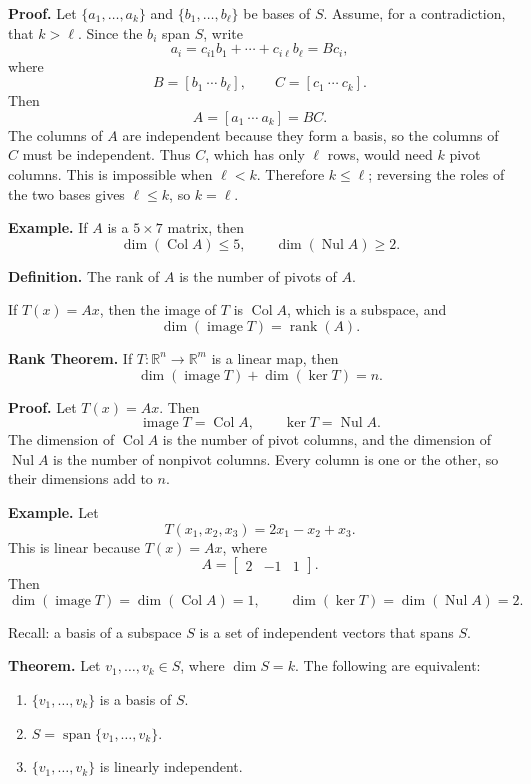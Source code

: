 \documentclass{article}
\begin{document}
\textbf{Proof.} Let $\{a_1,\ldots,a_k\}$ and $\{b_1,\ldots,b_\ell\}$ be bases of $S$. Assume, for a contradiction, that $k>\ell$. Since the $b_i$ span $S$, write
\[
a_i=c_{i1}b_1+\cdots+c_{i\ell}b_\ell=Bc_i,
\]
where
\[
B=[b_1\ \cdots\ b_\ell],
\qquad
C=[c_1\ \cdots\ c_k].
\]
Then
\[
A=[a_1\ \cdots\ a_k]=BC.
\]
The columns of $A$ are independent because they form a basis, so the columns of $C$ must be independent. Thus $C$, which has only $\ell$ rows, would need $k$ pivot columns. This is impossible when $\ell<k$. Therefore $k\leq\ell$; reversing the roles of the two bases gives $\ell\leq k$, so $k=\ell$.

\bigskip

\textbf{Example.} If $A$ is a $5\times 7$ matrix, then
\[
\dim(\operatorname{Col} A)\leq 5,
\qquad
\dim(\operatorname{Nul} A)\geq 2.
\]

\medskip

\textbf{Definition.} The rank of $A$ is the number of pivots of $A$.

\medskip

If $T(x)=Ax$, then the image of $T$ is $\operatorname{Col} A$, which is a subspace, and
\[
\dim(\operatorname{image} T)=\operatorname{rank}(A).
\]

\newpage

\textbf{Rank Theorem.} If $T:\mathbb{R}^n\to\mathbb{R}^m$ is a linear map, then
\[
\dim(\operatorname{image} T)+\dim(\ker T)=n.
\]

\textbf{Proof.} Let $T(x)=Ax$. Then
\[
\operatorname{image} T=\operatorname{Col} A,
\qquad
\ker T=\operatorname{Nul} A.
\]
The dimension of $\operatorname{Col} A$ is the number of pivot columns, and the dimension of $\operatorname{Nul} A$ is the number of nonpivot columns. Every column is one or the other, so their dimensions add to $n$.

\medskip

\textbf{Example.} Let
\[
T(x_1,x_2,x_3)=2x_1-x_2+x_3.
\]
This is linear because $T(x)=Ax$, where
\[
A=\begin{bmatrix}2&-1&1\end{bmatrix}.
\]
Then
\[
\dim(\operatorname{image} T)=\dim(\operatorname{Col} A)=1,
\qquad
\dim(\ker T)=\dim(\operatorname{Nul} A)=2.
\]

\bigskip

Recall: a basis of a subspace $S$ is a set of independent vectors that spans $S$.

\medskip

\textbf{Theorem.} Let $v_1,\ldots,v_k\in S$, where $\dim S=k$. The following are equivalent:
\begin{enumerate}
\item $\{v_1,\ldots,v_k\}$ is a basis of $S$.
\item $S=\operatorname{span}\{v_1,\ldots,v_k\}$.
\item $\{v_1,\ldots,v_k\}$ is linearly independent.
\end{enumerate}
\end{document}
